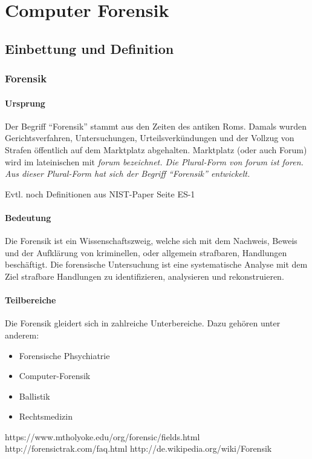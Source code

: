 \chapter{Computer Forensik}

\section{Einbettung und Definition}
\subsection{Forensik}
\subsubsection{Ursprung}
Der Begriff "`Forensik"' stammt aus den Zeiten des antiken Roms. Damals wurden Gerichtsverfahren, Untersuchungen, Urteilsverkündungen und der Vollzug von Strafen öffentlich auf dem Marktplatz abgehalten. Marktplatz (oder auch Forum) wird im lateinischen mit \it{forum} bezeichnet. Die Plural-Form von \it{forum} ist \it{foren}. Aus dieser Plural-Form hat sich der Begriff "`Forensik"' entwickelt.

Evtl. noch Definitionen aus NIST-Paper Seite ES-1

\subsubsection{Bedeutung}
Die Forensik ist ein Wissenschaftszweig, welche sich mit dem Nachweis, Beweis und der Aufklärung von kriminellen, oder allgemein strafbaren, Handlungen beschäftigt. Die forensische Untersuchung ist eine systematische Analyse mit dem Ziel strafbare Handlungen zu identifizieren, analysieren und rekonstruieren.

\subsubsection{Teilbereiche}
Die Forensik gleidert sich in zahlreiche Unterbereiche. Dazu gehören unter anderem: 
\begin{itemize}
\item Forensische Phsychiatrie

\item Computer-Forensik
\item Ballistik
\item Rechtsmedizin
\end{itemize}

https://www.mtholyoke.edu/org/forensic/fields.html
http://forensictrak.com/faq.html
http://de.wikipedia.org/wiki/Forensik

